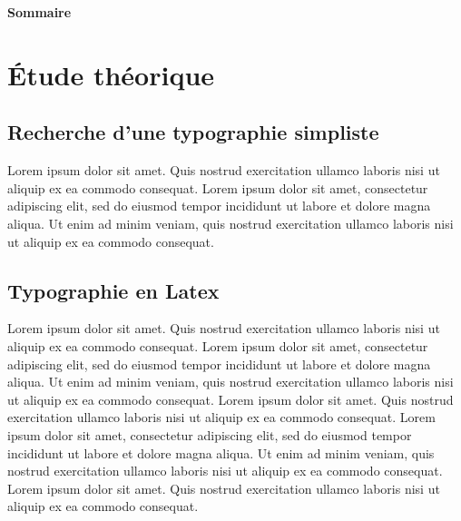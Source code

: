\documentclass[11pt]{memoir}
\begin{document}
\setcounter{secnumdepth}{3}
\thispagestyle{empty}


\newpage
\normalsize




\renewcommand{\contentsname}{} 
\par\noindent\textbf{\huge{\color{orange}Sommaire}}
\tableofcontents


\renewcommand{\chaptername}{Chapitre} 

\chapter{Étude théorique }\label{chap1}

\section{Recherche d'une typographie simpliste}

Lorem ipsum dolor sit amet. Quis nostrud exercitation ullamco laboris nisi ut aliquip ex ea commodo consequat. Lorem ipsum dolor sit amet, consectetur adipiscing elit, sed do eiusmod tempor incididunt ut labore et dolore magna aliqua. Ut enim ad minim veniam, quis nostrud exercitation ullamco laboris nisi ut aliquip ex ea commodo consequat. 

\section{Typographie en Latex}
Lorem ipsum dolor sit amet. Quis nostrud exercitation ullamco laboris nisi ut aliquip ex ea commodo consequat. Lorem ipsum dolor sit amet, consectetur adipiscing elit, sed do eiusmod tempor incididunt ut labore et dolore magna aliqua. Ut enim ad minim veniam, quis nostrud exercitation ullamco laboris nisi ut aliquip ex ea commodo consequat. Lorem ipsum dolor sit amet. Quis nostrud exercitation ullamco laboris nisi ut aliquip ex ea commodo consequat. Lorem ipsum dolor sit amet, consectetur adipiscing elit, sed do eiusmod tempor incididunt ut labore et dolore magna aliqua. Ut enim ad minim veniam, quis nostrud exercitation ullamco laboris nisi ut aliquip ex ea commodo consequat. 
Lorem ipsum dolor sit amet. Quis nostrud exercitation ullamco laboris nisi ut aliquip ex ea commodo consequat. 
\end{document}
